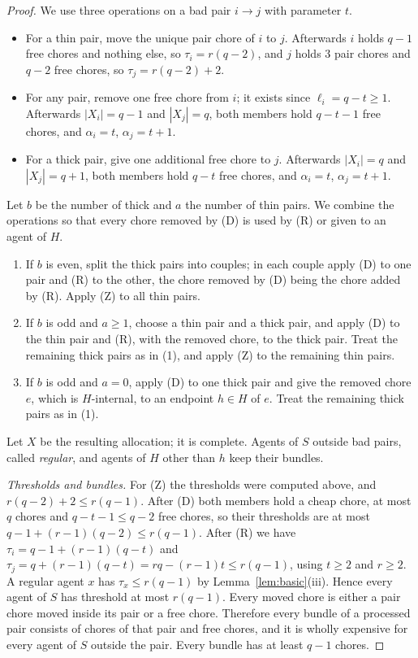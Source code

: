 \documentclass{amsart}
\numberwithin{equation}{section}
\theoremstyle{definition}
\theoremstyle{remark}
\begin{document}
\begin{proof}
We use three operations on a bad pair $i\to j$ with parameter $t$.
\begin{itemize}
\item[(Z)] For a thin pair, move the unique pair chore of $i$ to $j$. Afterwards $i$ holds $q-1$ free chores and nothing else, so $\tau_i=r(q-2)$, and $j$ holds $3$ pair chores and $q-2$ free chores, so $\tau_j=r(q-2)+2$.
\item[(D)] For any pair, remove one free chore from $i$; it exists since $\ell_i=q-t\ge1$. Afterwards $|X_i|=q-1$ and $|X_j|=q$, both members hold $q-t-1$ free chores, and $\alpha_i=t$, $\alpha_j=t+1$.
\item[(R)] For a thick pair, give one additional free chore to $j$. Afterwards $|X_i|=q$ and $|X_j|=q+1$, both members hold $q-t$ free chores, and $\alpha_i=t$, $\alpha_j=t+1$.
\end{itemize}
Let $b$ be the number of thick and $a$ the number of thin pairs. We combine the operations so that every chore removed by (D) is used by (R) or given to an agent of $H$.
\begin{enumerate}[label=(\arabic*)]
\item If $b$ is even, split the thick pairs into couples; in each couple apply (D) to one pair and (R) to the other, the chore removed by (D) being the chore added by (R). Apply (Z) to all thin pairs.
\item If $b$ is odd and $a\ge1$, choose a thin pair and a thick pair, and apply (D) to the thin pair and (R), with the removed chore, to the thick pair. Treat the remaining thick pairs as in (1), and apply (Z) to the remaining thin pairs.
\item If $b$ is odd and $a=0$, apply (D) to one thick pair and give the removed chore $e$, which is $H$-internal, to an endpoint $h\in H$ of $e$. Treat the remaining thick pairs as in (1).
\end{enumerate}
Let $X$ be the resulting allocation; it is complete. Agents of $S$ outside bad pairs, called \emph{regular}, and agents of $H$ other than $h$ keep their bundles.

\emph{Thresholds and bundles.} For (Z) the thresholds were computed above, and $r(q-2)+2\le r(q-1)$. After (D) both members hold a cheap chore, at most $q$ chores and $q-t-1\le q-2$ free chores, so their thresholds are at most $q-1+(r-1)(q-2)\le r(q-1)$. After (R) we have $\tau_i=q-1+(r-1)(q-t)$ and $\tau_j=q+(r-1)(q-t)=rq-(r-1)t\le r(q-1)$, using $t\ge2$ and $r\ge2$. A regular agent $x$ has $\tau_x\le r(q-1)$ by Lemma~\ref{lem:basic}(iii). Hence every agent of $S$ has threshold at most $r(q-1)$. Every moved chore is either a pair chore moved inside its pair or a free chore. Therefore every bundle of a processed pair consists of chores of that pair and free chores, and it is wholly expensive for every agent of $S$ outside the pair. Every bundle has at least $q-1$ chores.


\end{proof}
\end{document}
